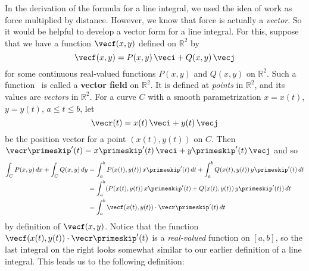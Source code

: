 In the derivation of the formula for a line integral, we used the idea of work as force multiplied by distance. However, we know that force is actually a \emph{vector}. So it would be helpful to develop a vector form for a line integral. For this, suppose that we have a function $\vecf(x,y)$ defined on $\mathbb{R}^2$ by
\[\vecf(x,y) = P(x,y)\,\veci + Q(x,y)\,\vecj\]
for some continuous real-valued functions $P(x,y)$ and $Q(x,y)$ on $\mathbb{R}^2$. Such a function \vecf\ is called a \textbf{vector field} on $\mathbb{R}^2$. It is defined at \emph{points} in $\mathbb{R}^2$, and its values are \emph{vectors} in $\mathbb{R}^2$. For a curve $C$ with a smooth parametrization $x=x(t)$, $y=y(t)$, $a \le t \le b$, let
\[\vecr(t) = x(t)\,\veci + y(t)\,\vecj\]
be the position vector for a point $(x(t),y(t))$ on $C$. Then $\vecr\primeskip'(t) = x\primeskip'(t)\,\veci + y\primeskip'(t)\,\vecj$ and so
\begin{align*}
 \int_C P(x,y)\,dx + \int_C Q(x,y)\,dy
 &= \int_a^b P(x(t),y(t)) \,x\primeskip'(t)\,dt + \int_a^b Q(x(t),y(t)) \,y\primeskip'(t)\,dt\\
  &= \int_a^b (P(x(t),y(t)) \,x\primeskip'(t) + Q(x(t),y(t)) \,y\primeskip'(t))\,dt\\
  &= \int_a^b \vecf(x(t),y(t))\cdot\vecr\primeskip'(t)\,dt
\end{align*}
by definition of $\vecf(x,y)$. Notice that the function $\vecf(x(t),y(t))\cdot\vecr\primeskip'(t)$ is a \emph{real-valued} function on $[a,b]$, so the last integral on the right looks somewhat similar to our earlier definition of a line integral. This leads us to the following definition:


